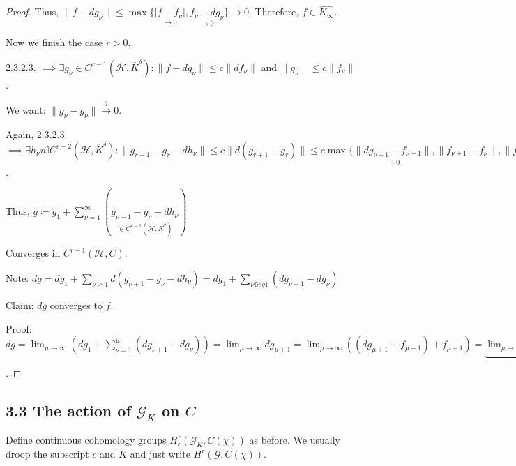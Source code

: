 \documentclass{article}
\theoremstyle{definition}
\numberwithin{theorem}{subsection}
\begin{document}
\begin{proof}
        Thus, \(\lVert f - d g_\nu \rVert \leq \max \{ \underset{\to 0}{\vert f - f_\nu \vert} , \underset{\to 0}{f_\nu - d g_\nu}  \} \to 0\). Therefore, \(f\in \widehat{K_\infty}\).

        Now we finish the case \(r > 0\).
        
        2.3.2.3. \(\implies \exists g_\nu \in C^{r-1} (\mathscr{H}, \overline{K}^\delta) : \lVert f - d g_\nu \rVert \leq c \lVert d f_\nu \rVert\) and \(\lVert g_\nu \rVert \leq c \lVert f_\nu \rVert\).
        
        We want: \(\lVert g_\nu - g_\nu \rVert \xrightarrow{?} 0\).
        
        Again, 2.3.2.3. \(\implies \exists h_\nu n\mathbb{I}  C^{r-2} (\mathscr{H}, \overline{K}^\delta): \lVert g_{r+1} - g_r - dh_\nu \rVert \leq c \lVert d(g_{r+1} - g_r) \rVert \leq c \max \{ \underset{\to 0}{\lVert d g_{\nu + 1} - f_{\nu + 1} \rVert}, \lVert f_{\nu + 1} - f_\nu \rVert , \underset{\to 0}{\lVert f_\nu - d g_\nu \rVert}\} \leq \max \{ \underset{\to 0}{\lVert f_{\nu+1} - f \rVert} , \underset{\to 0}{\lVert f - f_\nu \rVert} \} \).
        
        Thus, \(g\coloneqq g_1 + \sum_{\nu = 1}^{\infty} (\underset{\in C^{r-1} (\mathscr{H}, \overline{K}^\delta)}{g_{\nu+1} - g_\nu - dh_\nu})\) 

        Converges in \(C^{r-1}(\mathscr{H}, C)\).

        Note: \(dg = dg_1 + \sum_{\nu \geq 1} d(g_{\nu+1} - g_\nu - dh_\nu) = dg_1 + \sum_{\nu \mathbb{G} eq 1} (dg_{\nu+1} - dg_\nu)  \) 

        Claim: \(dg\) converges to \(f\).

        Proof: \(dg = \lim_{\mu \to \infty} (dg_1 + \sum_{\nu =1}^\mu (dg_{\nu+1} - dg_\nu)) = \lim_{\mu \to \infty} d g_{\mu+1} = \lim_{\mu \to \infty} ((dg_{\mu+1}-f_{\mu+1}) + f_{\mu+1}) = \underbrace{\lim_{\mu  \to \infty} (dg_{\mu+1}-f_{\mu+1})}_{=0} + \lim_{\mu\to \infty} f_{\mu+1} = f\). 

    \end{proof} 


    \subsection*{3.3 The action of \(\mathscr{G}_K\) on \(C\)}

    Define continuous cohomology groups \(H^r_c(\mathscr{G}_K, C(\chi))\) as before. We usually droop the subscript \(c\) and \(K\) and just write \(H^r(\mathscr{G}, C(\chi))\).
\end{document}
